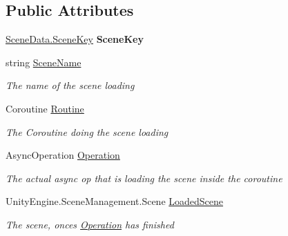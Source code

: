 \subsection*{Public Attributes}
\begin{DoxyCompactItemize}
\item 
\hypertarget{struct_skyrates_1_1_client_1_1_scene_1_1_scene_loader_1_1_loading_sequence_ad55bdb5b809e630810234a390363e161}{\hyperlink{class_skyrates_1_1_client_1_1_scene_1_1_scene_data_a31ee71a248fd3456a7e655f71f268583}{Scene\-Data.\-Scene\-Key} {\bfseries Scene\-Key}}\label{struct_skyrates_1_1_client_1_1_scene_1_1_scene_loader_1_1_loading_sequence_ad55bdb5b809e630810234a390363e161}

\item 
string \hyperlink{struct_skyrates_1_1_client_1_1_scene_1_1_scene_loader_1_1_loading_sequence_a2ec62fc91db13a2c919f5c75f06c515f}{Scene\-Name}
\begin{DoxyCompactList}\small\item\em The name of the scene loading \end{DoxyCompactList}\item 
Coroutine \hyperlink{struct_skyrates_1_1_client_1_1_scene_1_1_scene_loader_1_1_loading_sequence_a40e91dc9afde92c3229df4202f8fc7eb}{Routine}
\begin{DoxyCompactList}\small\item\em The Coroutine doing the scene loading \end{DoxyCompactList}\item 
Async\-Operation \hyperlink{struct_skyrates_1_1_client_1_1_scene_1_1_scene_loader_1_1_loading_sequence_a6505c988f53074f64b4f1dcd49d58396}{Operation}
\begin{DoxyCompactList}\small\item\em The actual async op that is loading the scene inside the coroutine \end{DoxyCompactList}\item 
Unity\-Engine.\-Scene\-Management.\-Scene \hyperlink{struct_skyrates_1_1_client_1_1_scene_1_1_scene_loader_1_1_loading_sequence_ac9c9a9dde71178f12f33846b26ec1613}{Loaded\-Scene}
\begin{DoxyCompactList}\small\item\em The scene, onces \hyperlink{struct_skyrates_1_1_client_1_1_scene_1_1_scene_loader_1_1_loading_sequence_a6505c988f53074f64b4f1dcd49d58396}{Operation} has finished \end{DoxyCompactList}\end{DoxyCompactItemize}


